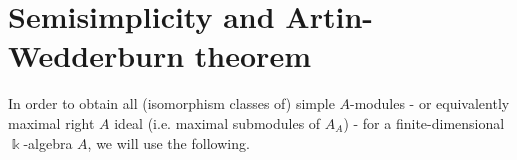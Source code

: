 \documentclass[11pt,a4paper]{article}
\makeatletter
\numberwithin{equation}{section}
\renewenvironment{proof}[1][\proofname]{\par
    \pushQED{\qed}%
    \normalfont \topsep0\p@\@plus6\p@ \labelsep1em\relax
    \trivlist
    \item[\hskip\labelsep\indent
        \bfseries #1]\ignorespaces
    \mbox{}
}{
    \popQED\endtrivlist\@endpefalse
}
\theoremstyle{all}
\newtheorem{proposition}[theorem]{Proposition}
\theoremstyle{remark}
\newcommand{\rad}{\operatorname{rad}\nolimits}
\makeatother
\begin{document}
%
%
%

\pagebreak

\section{Semisimplicity and Artin-Wedderburn theorem}

In order to obtain all (isomorphism classes of) simple $A$-modules - or equivalently maximal right $A$ ideal (i.e. maximal submodules of $A_A$) - for a finite-dimensional $\Bbbk$-algebra $A$, we will use the following.
\end{document}
